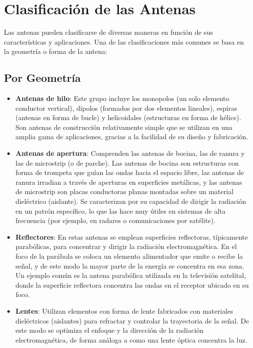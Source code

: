  
 
\section{Clasificación de las Antenas}

Las antenas pueden clasificarse de diversas maneras en función de sus características y aplicaciones. Una de las clasificaciones más comunes se basa en la geometría o forma de la antena:

\subsection{Por Geometría}
\begin{itemize}
    \item \textbf{Antenas de hilo}: Este grupo incluye los monopolos (un solo elemento conductor vertical), dipolos (formados por dos elementos lineales), espiras (antenas en forma de bucle) y helicoidales (estructuras en forma de hélice). Son antenas de construcción relativamente simple que se utilizan en una amplia gama de aplicaciones, gracias a la facilidad de su diseño y fabricación.\\
    
    \item \textbf{Antenas de apertura}: Comprenden las antenas de bocina, las de ranura y las de microstrip (o de parche). Las antenas de bocina son estructuras con forma de trompeta que guían las ondas hacia el espacio libre, las antenas de ranura irradian a través de aperturas en superficies metálicas, y las antenas de microstrip son placas conductoras planas montadas sobre un material dieléctrico (aislante). Se caracterizan por su capacidad de dirigir la radiación en un patrón específico, lo que las hace muy útiles en sistemas de alta frecuencia (por ejemplo, en radares o comunicaciones por satélite).\\
    
    \item \textbf{Reflectores}: En estas antenas se emplean superficies reflectoras, típicamente parabólicas, para concentrar y dirigir la radiación electromagnética. En el foco de la parábola se coloca un elemento alimentador que emite o recibe la señal, y de este modo la mayor parte de la energía se concentra en esa zona. Un ejemplo común es la antena parabólica utilizada en la televisión satelital, donde la superficie reflectora concentra las ondas en el receptor ubicado en su foco.\\
    
    \item \textbf{Lentes}: Utilizan elementos con forma de lente fabricados con materiales dieléctricos (aislantes) para refractar y controlar la trayectoria de la señal. De este modo se optimiza el enfoque y la dirección de la radiación electromagnética, de forma análoga a como una lente óptica concentra la luz.\\
    

\end{itemize}
